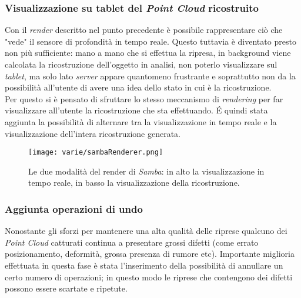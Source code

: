 \subsubsection{Visualizzazione su tablet del \emph{Point Cloud} ricostruito}
Con il \emph{render} descritto nel punto precedente è possibile rappresentare ciò che "vede" il sensore di profondità in tempo reale. Questo tuttavia è diventato presto non più sufficiente: mano a mano che si effettua la ripresa, in background viene calcolata la ricostruzione dell'oggetto in analisi, non poterlo visualizzare sul \emph{tablet}, ma solo lato \emph{server} appare quantomeno frustrante e soprattutto non da la possibilità all'utente di avere una idea dello stato in cui è la ricostruzione. \\
Per questo si è pensato di sfruttare lo stesso meccanismo di \emph{rendering} per far visualizzare all'utente la ricostruzione che sta effettuando. É quindi stata aggiunta la possibilità di alternare tra la visualizzazione in tempo reale e la visualizzazione dell'intera ricostruzione generata.\\
\begin{figure}[H] 
    \centering 
    \texttt{[image: varie/sambaRenderer.png]} 
    \caption{Le due modalità del render di \emph{Samba}: in alto la visualizzazione in tempo reale, in basso la visualizzazione della ricostruzione.}
    \label{fig:render-rajawali}
\end{figure}


\subsubsection{Aggiunta operazioni di undo}
Nonostante gli sforzi per mantenere una alta qualità delle riprese qualcuno dei \emph{Point Cloud} catturati continua a presentare grossi difetti (come errato posizionamento, deformità, grossa presenza di rumore etc).
Importante miglioria effettuata in questa fase è stata l'inserimento della possibilità di annullare un certo numero di operazioni; in questo modo le riprese che contengono dei difetti possono essere scartate e ripetute.

